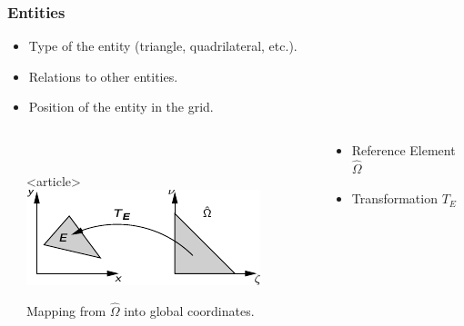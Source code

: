\documentclass[aspectratio=169,11pt]{beamer}
\theoremstyle{definition}
\begin{document}
\begin{frame}
  \frametitle{Entities}

  \begin{itemize}
  \item Type of the entity (triangle, quadrilateral, etc.).
  \item Relations to other entities.
  \end{itemize}
  \begin{itemize}
  \item Position of the entity in the grid.
  \end{itemize}

  \pause
  \begin{columns}
    \begin{column}{5mm}
    \end{column}
    \begin{column}{0.4\textwidth}
      \begin{center}
        \\
        \begin{onlyenv}<article>
          \includegraphics[width=0.6\linewidth]{refelem-mapping}\\
        \end{onlyenv}
        \centerline{\tiny Mapping from $\hat{\Omega}$ into global coordinates.}
      \end{center}
    \end{column}
    \begin{column}{0.5\textwidth}
        \begin{itemize}
        \item Reference Element $\hat{\Omega}$
        \item Transformation $T_E$
        \end{itemize}
    \end{column}
  \end{columns}


\end{frame}
\end{document}

